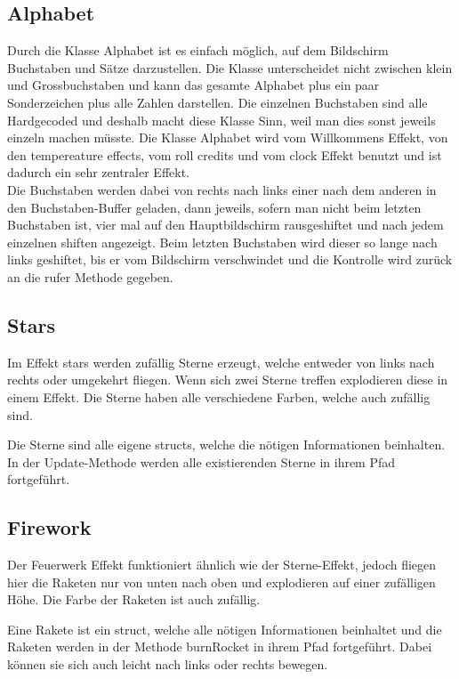 \documentclass[12pt,a4paper]{article}
\begin{document}
\subsection{Alphabet}

Durch die Klasse Alphabet ist es einfach möglich, auf dem Bildschirm Buchstaben und Sätze darzustellen. Die Klasse unterscheidet nicht zwischen klein und Grossbuchstaben und kann das gesamte Alphabet plus ein paar Sonderzeichen plus alle Zahlen darstellen. Die einzelnen Buchstaben sind alle Hardgecoded und deshalb macht diese Klasse Sinn, weil man dies sonst jeweils einzeln machen müsste. Die Klasse Alphabet wird vom Willkommens Effekt, von den tempereature effects, vom roll credits und vom clock Effekt benutzt und ist dadurch ein sehr zentraler Effekt. \\

Die Buchstaben werden dabei von rechts nach links einer nach dem anderen in den Buchstaben-Buffer geladen, dann jeweils, sofern man nicht beim letzten Buchstaben ist, vier mal auf den Hauptbildschirm rausgeshiftet und nach jedem einzelnen shiften angezeigt. Beim letzten Buchstaben wird dieser so lange nach links geshiftet, bis er vom Bildschirm verschwindet und die Kontrolle wird zurück an die rufer Methode gegeben.

\subsection{Stars}

Im Effekt stars werden zufällig Sterne erzeugt, welche entweder von links nach rechts oder umgekehrt fliegen. Wenn sich zwei Sterne treffen explodieren diese in einem Effekt. Die Sterne haben alle verschiedene Farben, welche auch zufällig sind. 

Die Sterne sind alle eigene structs, welche die nötigen Informationen beinhalten. In der Update-Methode werden alle existierenden Sterne in ihrem Pfad fortgeführt.

\subsection{Firework}

Der Feuerwerk Effekt funktioniert ähnlich wie der Sterne-Effekt, jedoch fliegen hier die Raketen nur von unten nach oben und explodieren auf einer zufälligen Höhe. Die Farbe der Raketen ist auch zufällig.

Eine Rakete ist ein struct, welche alle nötigen Informationen beinhaltet und die Raketen werden in der Methode burnRocket in ihrem Pfad fortgeführt. Dabei können sie sich auch leicht nach links oder rechts bewegen.
\end{document}
